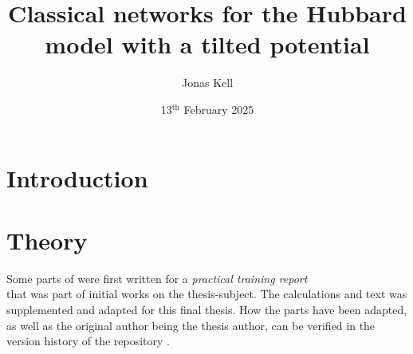 \documentclass[
headings=optiontohead,              %
12pt,                               %
DIV=13,                             %
twoside=false,                      %
open=right,                         %
BCOR=00mm,                          %
toc=bibliographynumbered            %
]{scrreport}
\title{Classical networks for the Hubbard model with a tilted potential}
\author{Jonas Kell}
\date{13$^\text{th}$ February 2025}
\begin{document}
\thispagestyle{empty}                           %
\cleardoublepage                                %
\pagestyle{scrheadings}                         %
\renewcommand{\contentsname}{Table of Contents} %
\tableofcontents                                %
\cleardoublepage                                %

\clearpairofpagestyles
\ihead{\leftmark}
\ohead{\Ifstr{\leftmark}{\rightmark}{}{\rightmark}}
\cfoot*{\pagemark}

\renewcommand{\theequation}{\arabic{equation}} %

\chapter{Introduction}
\label{sec:introduction}

\FloatBarrier

\chapter{Theory}
\label{sec:theory}

Some parts of  were first written for a \emph{practical training report}\\  that was part of initial works on the thesis-subject.
The calculations and text was supplemented and adapted for this final thesis. 
How the parts have been adapted, as well as the original author being the thesis author, can be verified in the version history of the repository \cite{selfDocument}.
\end{document}
